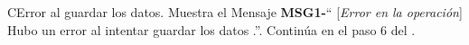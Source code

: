 \begin{UCtrayectoriaA}{C}{Error al guardar los datos.}
			\UCpaso Muestra el Mensaje {\bf MSG1-}`` [{\em Error en la operación}] Hubo un error al intentar guardar los datos .''.
			\UCpaso Continúa en el paso 6 del .
		\end{UCtrayectoriaA}
